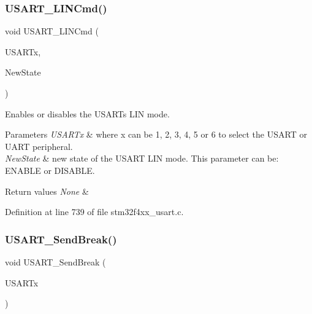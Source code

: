\subsubsection{\texorpdfstring{U\+S\+A\+R\+T\+\_\+\+L\+I\+N\+Cmd()}{USART\_LINCmd()}}
{\footnotesize\ttfamily void U\+S\+A\+R\+T\+\_\+\+L\+I\+N\+Cmd (\begin{DoxyParamCaption}\item[{\hyperlink{struct_u_s_a_r_t___type_def}{U\+S\+A\+R\+T\+\_\+\+Type\+Def} $\ast$}]{U\+S\+A\+R\+Tx,  }\item[{Functional\+State}]{New\+State }\end{DoxyParamCaption})}



Enables or disables the U\+S\+A\+RT\textquotesingle{}s L\+IN mode. 


\begin{DoxyParams}{Parameters}
{\em U\+S\+A\+R\+Tx} & where x can be 1, 2, 3, 4, 5 or 6 to select the U\+S\+A\+RT or U\+A\+RT peripheral. \\
\hline
{\em New\+State} & new state of the U\+S\+A\+RT L\+IN mode. This parameter can be\+: E\+N\+A\+B\+LE or D\+I\+S\+A\+B\+LE. \\
\hline
\end{DoxyParams}

\begin{DoxyRetVals}{Return values}
{\em None} & \\
\hline
\end{DoxyRetVals}


Definition at line 739 of file stm32f4xx\+\_\+usart.\+c.

\mbox{\label{group___u_s_a_r_t___group4_ga39a3d33e23ee28529fa8f7259ce6811e}} 
\subsubsection{\texorpdfstring{U\+S\+A\+R\+T\+\_\+\+Send\+Break()}{USART\_SendBreak()}}
{\footnotesize\ttfamily void U\+S\+A\+R\+T\+\_\+\+Send\+Break (\begin{DoxyParamCaption}\item[{\hyperlink{struct_u_s_a_r_t___type_def}{U\+S\+A\+R\+T\+\_\+\+Type\+Def} $\ast$}]{U\+S\+A\+R\+Tx }\end{DoxyParamCaption})}



